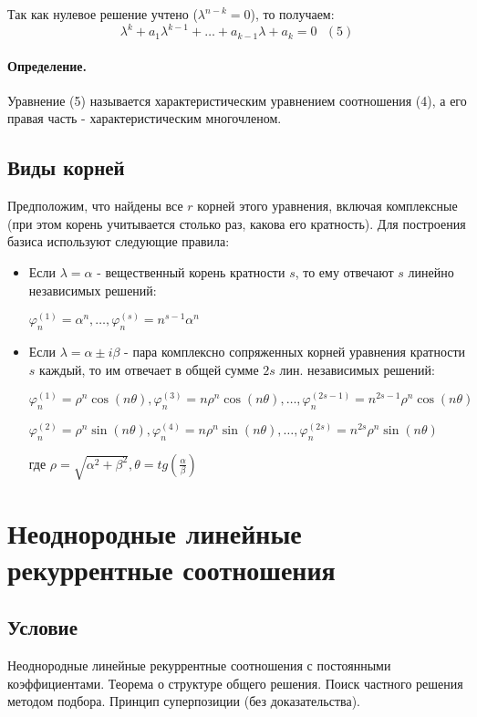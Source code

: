 \documentclass{report}
\begin{document}
Так как нулевое решение учтено ($\lambda^{n-k} = 0$), то получаем:
\[
	\lambda^{k} + a_1\lambda^{k-1} + \ldots + a_{k-1}\lambda + a_{k} = 0 \mbox{    } (5)
\] 

\paragraph*{Определение.}
Уравнение (5) называется характеристическим уравнением соотношения (4), а его правая часть -
характеристическим многочленом.

\subsection{Виды корней}

Предположим, что найдены все $r$ корней этого уравнения, включая комплексные (при этом
корень учитывается столько раз, какова его кратность). Для построения базиса используют
следующие правила:

 \begin{itemize}
	 \item Если $\lambda = \alpha$ - вещественный корень кратности  $s$, то
		 ему отвечают  $s$ линейно независимых решений:

		 $\varphi^{(1)}_{n} = \alpha^{n}, \ldots,\varphi^{(s)}_{n} = n^{s-1}\alpha^{n}$ 
	\item Если $\lambda = \alpha \pm i\beta$ - пара комплексно сопряженных корней уравнения
		кратности  $s$ каждый, то им отвечает в общей сумме  $2s$ лин.
		независимых решений:

		$\varphi^{(1)}_{n} = \rho^{n}\cos(n\theta),\varphi^{(3)}_{n} = n\rho^{n}\cos(n\theta),
		\ldots,\varphi^{(2s-1)}_{n} = n^{2s-1}\rho^{n}\cos(n\theta)$ 


		$\varphi^{(2)}_{n} = \rho^{n}\sin(n\theta),\varphi^{(4)}_{n} = n\rho^{n}\sin(n\theta),
		\ldots,\varphi^{(2s)}_{n} = n^{2s}\rho^{n}\sin(n\theta)$

		где $\rho = \sqrt{\alpha^2+\beta^2} , \theta = tg(\frac{\alpha}{\beta})$
\end{itemize}

\newpage

\section{Неоднородные линейные рекуррентные соотношения}
\subsection{Условие}
Неоднородные линейные рекуррентные соотношения с постоянными
коэффициентами. Теорема о структуре общего решения. Поиск частного решения
методом подбора. Принцип суперпозиции (без доказательства).
\end{document}
